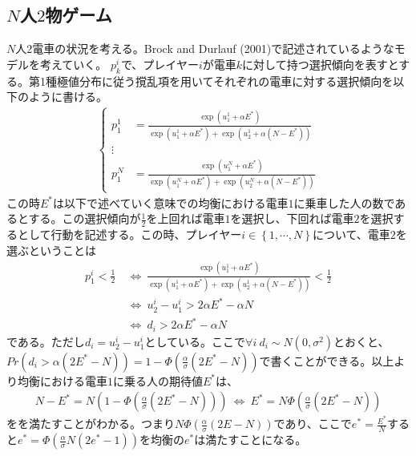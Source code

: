 \documentclass{jsarticle}
\begin{document}
\subsection{$N$人$2$物ゲーム}
$N$人$2$電車の状況を考える。Brock and Durlauf (2001)で記述されているようなモデルを考えていく。
$p_k^i$で、プレイヤー$i$が電車$k$に対して持つ選択傾向を表すとする。第1種極値分布に従う撹乱項を用いてそれぞれの電車に対する選択傾向を以下のように書ける。
\begin{align*}
	\begin{cases}
	p_1^1 &= \frac{\exp(u_1^1 + \alpha E^*)}{\exp(u_1^1 + \alpha E^*) + \exp(u_2^1 + \alpha(N - E^*))}\\[8pt]
	\vdots\\[8pt]
	p_1^N &= \frac{\exp(u_1^N + \alpha E^*)}{\exp(u_1^N + \alpha E^*) + \exp(u_2^N + \alpha(N - E^*))}
	\end{cases}
\end{align*}
この時$E^*$は以下で述べていく意味での均衡における電車$1$に乗車した人の数であるとする。この選択傾向が$\frac{1}{2}$を上回れば電車$1$を選択し、下回れば電車$2$を選択するとして行動を記述する。この時、プレイヤー$i \in \left\{ 1, \cdots, N\right\}$について、電車$2$を選ぶということは
\begin{align*}
	p_1^i < \frac{1}{2}\ &\Leftrightarrow\ \frac{\exp(u_1^1 + \alpha E^*)}{\exp(u_1^1 + \alpha E^*) + \exp(u_2^1 + \alpha(N - E^*))} < \frac{1}{2}\\[8pt]
	&\Leftrightarrow\ u_2^i - u_1^i > 2\alpha E^* - \alpha N\\[8pt]
	&\Leftrightarrow\ d_i > 2\alpha E^* - \alpha N
\end{align*}
である。ただし$d_i = u_2^i - u_1^i$としている。ここで$\forall i\ d_i \sim N(0,\sigma^2)$とおくと、$Pr(d_i > \alpha(2E^* - N)) = 1 - \Phi \left(\frac{\alpha}{\sigma}(2 E^* - N)\right)$で書くことができる。以上より均衡における電車$1$に乗る人の期待値$ E^*$は、
\begin{align*}
	N - E^* =  N(1 - \Phi \left(\frac{\alpha}{\sigma}(2 E^* - N)\right))\ \Leftrightarrow\  E^* = N\Phi \left(\frac{\alpha}{\sigma}(2 E^* - N)\right)
\end{align*}
をを満たすことがわかる。つまり$N \Phi \left(\frac{\alpha}{\sigma}(2 E - N)\right)$であり、ここで$e^* = \frac{E^*}{N}$すると$e^* = \Phi \left(\frac{\alpha}{\sigma}N(2e^* - 1) \right)$を均衡の$e^*$は満たすことになる。
\end{document}
